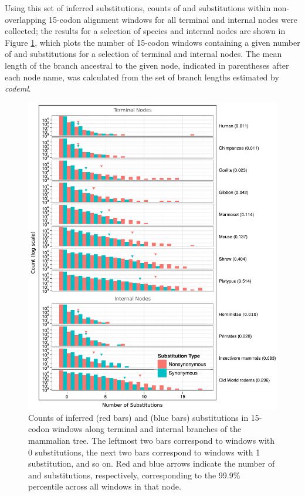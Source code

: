 Using this set of inferred substitutions, counts of \syn and \nsyn
substitutions within non-overlapping 15-codon alignment windows for
all terminal and internal nodes were collected; the results for a
selection of species and internal nodes are shown in Figure
\ref{fig_wcs}, which plots the number of 15-codon windows containing a
given number of \nsyn and \syn substitutions for a selection of
terminal and internal nodes. The mean length of the branch ancestral
to the given node, indicated in parentheses after each node name, was
calculated from the set of branch lengths estimated by \emph{codeml}.

\begin{figure}
\centering \includegraphics[scale=0.75]{Figs/wcs_15.pdf}
\caption{Counts of inferred \nsyn (red bars) and \syn (blue bars)
  substitutions in 15-codon windows along terminal and internal
  branches of the mammalian tree. The leftmost two bars correspond to
  windows with 0 substitutions, the next two bars correspond to
  windows with 1 substitution, and so on. Red and blue arrows indicate
  the number of \nsyn and \syn substitutions, respectively,
  corresponding to the 99.9\% percentile across all windows in that
  node.}
\label{fig_wcs}
\end{figure}

